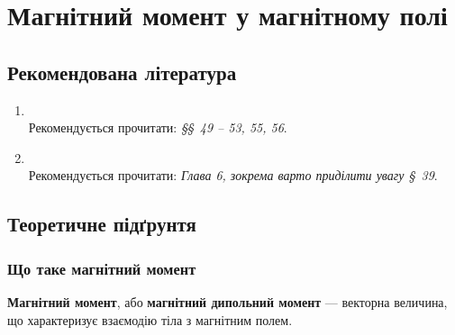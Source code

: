 \expandafter\graphicspath\expandafter{\expandafter{\currfilebase/pic}}







\chapter{Магнітний момент у магнітному полі}
\makeworktitle

\section*{Рекомендована література }
\begin{enumerate}
\item {}\\[0.5ex]
    Рекомендується прочитати: \emph{\S\S~49 -- 53, 55, 56}.
\item {}\\[0.5ex]
    Рекомендується прочитати: \emph{Глава 6, зокрема варто приділити увагу \S~39}.
\end{enumerate}

\section{Теоретичне підґрунтя}
\subsection{Що таке магнітний момент}

\textbf{Магнітний момент}, або \textbf{магнітний дипольний момент} --- векторна величина, що характеризує взаємодію тіла з магнітним полем.

